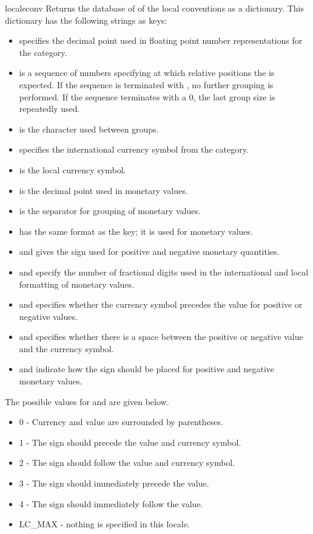 \begin{funcdesc}{localeconv}{}
Returns the database of of the local conventions as a dictionary. This
dictionary has the following strings as keys:
\begin{itemize}
\item {} specifies the decimal point used in
floating point number representations for the 
category.
\item {} is a sequence of numbers specifying at which
relative positions the  is expected. If the
sequence is terminated with , no further
grouping is performed. If the sequence terminates with a 0, the last
group size is repeatedly used.
\item {} is the character used between groups.
\item {} specifies the international currency
symbol from the  category.
\item {} is the local currency symbol.
\item {} is the decimal point used in monetary
values.
\item {} is the separator for grouping of
monetary values.
\item {} has the same format as the 
key; it is used for monetary values.
\item {} and  gives the sign
used for positive and negative monetary quantities.
\item {} and  specify the number
of fractional digits used in the international and local formatting
of monetary values.
\item {} and  specifies whether
the currency symbol precedes the value for positive or negative
values.
\item {} and  specifies
whether there is a space between the positive or negative value and
the currency symbol.
\item {} and  indicate how the
sign should be placed for positive and negative monetary values. 
\end{itemize}
The possible values for  and 
are given below.
\begin{itemize}
\item 0 - Currency and value are surrounded by parentheses.
\item 1 - The sign should precede the value and currency symbol.
\item 2 - The sign should follow the value and currency symbol.
\item 3 - The sign should immediately precede the value.
\item 4 - The sign should immediately follow the value.
\item LC_MAX - nothing is specified in this locale.
\end{itemize}
\end{funcdesc}

